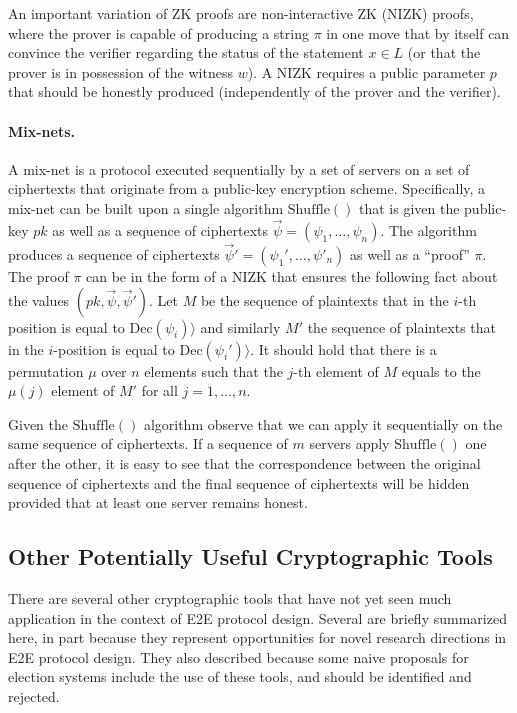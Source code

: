 An important variation of ZK proofs are non-interactive ZK (NIZK)
proofs, where the prover is capable of producing a string $\pi$ in one
move that by itself can convince the verifier regarding the status of
the statement $x\in L$ (or that the prover is in possession of the
witness $w$). A NIZK requires a public parameter $p$ that should be
honestly produced (independently of the prover and the verifier).

\paragraph{Mix-nets.} A mix-net is a protocol executed sequentially by
a set of servers on a set of ciphertexts that originate from a
public-key encryption scheme.  Specifically, a mix-net can be built
upon a single algorithm $\mathrm{Shuffle}()$ that is given the
public-key $pk$ as well as a sequence of ciphertexts
$\vec\psi = (\psi_1,\ldots, \psi_n)$.  The algorithm produces a
sequence of ciphertexts $\vec\psi' = (\psi_1', \ldots, \psi'_n)$ as
well as a ``proof'' $\pi$. The proof $\pi$ can be in the form of a
NIZK that ensures the following fact about the values
$(pk, \vec \psi, \vec \psi')$. Let $M$ be the sequence of plaintexts
that in the $i$-th position is equal to
$ \mathrm{Dec}(\psi_i) \rangle$ and similarly $M'$ the sequence of
plaintexts that in the $i$-position is equal to
$\mathrm{Dec}(\psi_i') \rangle$.  It should hold that there is a
permutation $\mu$ over $n$ elements such that the $j$-th element of
$M$ equals to the $\mu(j)$ element of $M'$ for all $j=1,\ldots, n$.

Given the $\mathrm{Shuffle}()$ algorithm observe that we can apply it
sequentially on the same sequence of ciphertexts. If a sequence of $m$
servers apply $\mathrm{Shuffle}()$ one after the other, it is easy to
see that the correspondence between the original sequence of
ciphertexts and the final sequence of ciphertexts will be hidden
provided that at least one server remains honest.

\subsection{Other Potentially Useful Cryptographic Tools}

There are several other cryptographic tools that have not yet seen
much application in the context of E2E protocol design. Several are
briefly summarized here, in part because they represent opportunities
for novel research directions in E2E protocol design. They also
described because some naive proposals for election systems include
the use of these tools, and should be identified and rejected.

